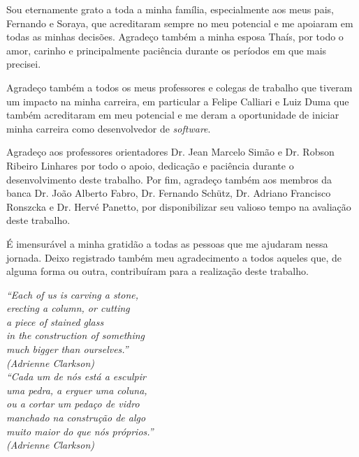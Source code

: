 \begin{agradecimentos}

Sou eternamente grato a toda a minha família, especialmente aos meus pais,
Fernando e Soraya, que acreditaram sempre no meu potencial e me apoiaram em
todas as minhas decisões. Agradeço também a minha esposa Thaís, por todo o amor,
carinho e principalmente paciência durante os períodos em que mais precisei.

Agradeço também a todos os meus professores e colegas de trabalho que tiveram um
impacto na minha carreira, em particular a Felipe Calliari e Luiz Duma que
também acreditaram em meu potencial e me deram a oportunidade de iniciar minha
carreira como desenvolvedor de \textit{software}.

Agradeço aos professores orientadores Dr. Jean Marcelo Simão e Dr. Robson
Ribeiro Linhares por todo o apoio, dedicação e paciência durante o
desenvolvimento deste trabalho. Por fim, agradeço também aos membros da banca Dr. João
Alberto Fabro, Dr. Fernando Schütz, Dr. Adriano Francisco Ronszcka e Dr. Hervé Panetto, por
disponibilizar seu valioso tempo na avaliação deste trabalho.

É imensurável a minha gratidão a todas as pessoas que me ajudaram nessa jornada.
Deixo registrado também meu agradecimento a todos aqueles que, de alguma forma
ou outra, contribuíram para a realização deste trabalho.

\end{agradecimentos}

\begin{epigrafe}
\vspace*{\fill}
\begin{flushright}
\textit{
``Each of us is carving a stone,\\
erecting a column, or cutting \\
a piece of stained glass \\
in the construction of something \\
much bigger than ourselves.'' \\
(Adrienne Clarkson) \\
}
\textit{
``Cada um de nós está a esculpir \\
uma pedra, a erguer uma coluna, \\
ou a cortar um pedaço de vidro \\
manchado na construção de algo \\
muito maior do que nós próprios.'' \\
(Adrienne Clarkson) \\
}
\end{flushright}
\end{epigrafe}


